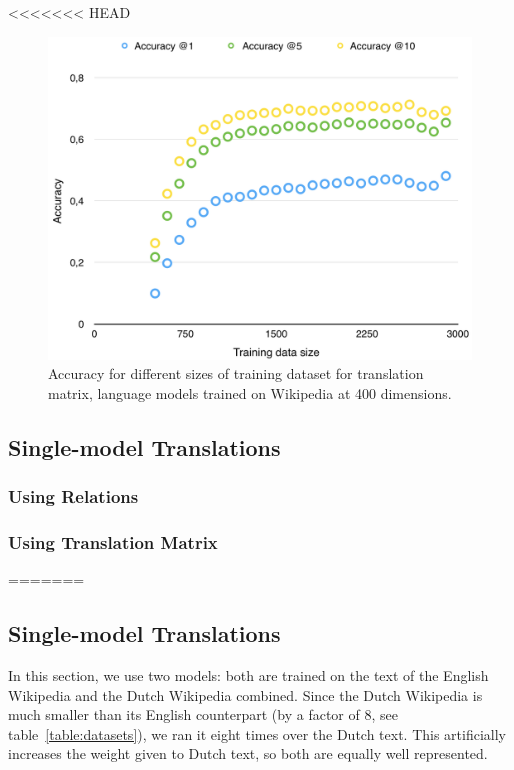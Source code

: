 <<<<<<< HEAD

\begin{figure}[ht!]
  \centering \includegraphics[width=\linewidth]{images/accuracy_nlwiki400_enwiki400_lowercase}
  \caption{Accuracy for different sizes of training dataset for translation matrix, language models trained on Wikipedia at 400 dimensions.}
  \label{fig:accuracy_nlwiki400_enwiki400_lowercase}
\end{figure}

\subsection{Single-model Translations}
\subsubsection{Using Relations}

\subsubsection{Using Translation Matrix}
=======
\subsection{Single-model Translations}
In this section, we use two models: both are trained on the text of the English Wikipedia and the Dutch Wikipedia combined. Since the Dutch Wikipedia is much smaller than its English counterpart (by a factor of 8, see table~\ref{table:datasets}), we ran it eight times over the Dutch text. This artificially increases the weight given to Dutch text, so both are equally well represented.

